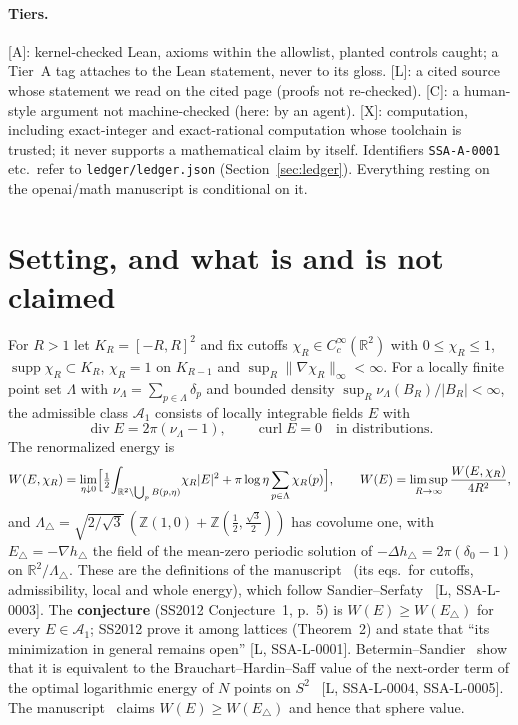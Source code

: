 \documentclass[10pt]{article}
\newcommand{\R}{\mathbb{R}}
\newcommand{\tier}[1]{\textsf{[#1]}}
\newcommand{\curl}{\operatorname{curl}}
\renewcommand{\div}{\operatorname{div}}
\begin{document}
\paragraph{Tiers.} \tier{A}: kernel-checked Lean, axioms within the allowlist, planted controls caught; a Tier~A tag attaches to the
Lean statement, never to its gloss. \tier{L}: a cited source whose statement we read on the cited page (proofs not re-checked).
\tier{C}: a human-style argument not machine-checked (here: by an agent). \tier{X}: computation, including exact-integer and
exact-rational computation whose toolchain is trusted; it never supports a mathematical claim by itself. Identifiers
\texttt{SSA-A-0001} etc.\ refer to \texttt{ledger/ledger.json} (Section~\ref{sec:ledger}). Everything resting on the openai/math
manuscript is conditional on it.

\section{Setting, and what is and is not claimed}\label{sec:setting}
For $R>1$ let $K_R=[-R,R]^2$ and fix cutoffs $\chi_R\in C_c^\infty(\R^2)$ with $0\le\chi_R\le1$, $\operatorname{supp}\chi_R\subset K_R$,
$\chi_R=1$ on $K_{R-1}$ and $\sup_R\|\nabla\chi_R\|_\infty<\infty$. For a locally finite point set $\Lambda$ with
$\nu_\Lambda=\sum_{p\in\Lambda}\delta_p$ and bounded density $\sup_R\nu_\Lambda(B_R)/|B_R|<\infty$, the admissible class
$\mathcal A_1$ consists of locally integrable fields $E$ with
\begin{equation}\label{eq:adm}\div E=2\pi(\nu_\Lambda-1),\qquad \curl E=0\quad\text{in distributions.}\end{equation}
The renormalized energy is
\begin{equation}\label{eq:W}
W(E,\chi_R)=\lim_{\eta\downarrow0}\Bigl[\tfrac12\!\int_{\R^2\setminus\bigcup_pB(p,\eta)}\!\chi_R|E|^2+\pi\log\eta\sum_{p\in\Lambda}\chi_R(p)\Bigr],\qquad
W(E)=\limsup_{R\to\infty}\frac{W(E,\chi_R)}{4R^2},
\end{equation}
and $\Lambda_\triangle=\sqrt{2/\sqrt3}\,(\mathbb Z(1,0)+\mathbb Z(\tfrac12,\tfrac{\sqrt3}2))$ has covolume one, with $E_\triangle=-\nabla h_\triangle$
the field of the mean-zero periodic solution of $-\Delta h_\triangle=2\pi(\delta_0-1)$ on $\R^2/\Lambda_\triangle$. These are the
definitions of the manuscript~\cite{oai} (its eqs.\ for cutoffs, admissibility, local and whole energy), which follow
Sandier--Serfaty~\cite{ss} \tier{L, SSA-L-0003}. The \textbf{conjecture} (SS2012 Conjecture~1, p.~5) is $W(E)\ge W(E_\triangle)$ for every $E\in\mathcal A_1$;
SS2012 prove it among lattices (Theorem~2) and state that ``its minimization in general remains open'' \tier{L, SSA-L-0001}.
Betermin--Sandier~\cite{bs} show that it is equivalent to the Brauchart--Hardin--Saff value of the next-order term of the optimal
logarithmic energy of $N$ points on $S^2$~\cite{bhs} \tier{L, SSA-L-0004, SSA-L-0005}. The manuscript~\cite{oai} claims
$W(E)\ge W(E_\triangle)$ and hence that sphere value.
\end{document}

